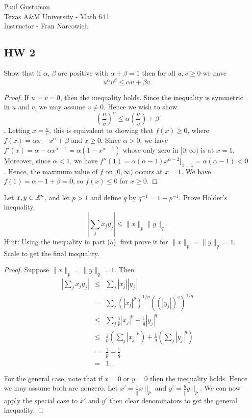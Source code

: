 \documentclass{article}
\begin{document}
\noindent Paul Gustafson\\
\noindent Texas A\&M University - Math 641\\ 
\noindent Instructor - Fran Narcowich

\subsection*{HW 2}
 Show that if $\alpha$, $\beta$ are positive with $\alpha + \beta = 1$ then for all $u,v \ge 0$ we have
$$ u^\alpha v^\beta \le \alpha u + \beta v.$$
\begin{proof} If $u = v = 0$, then the inequality holds. Since the inequality is symmetric in $u$ and $v$, we may assume $v \neq 0$.
Hence we wish to show
$$(\frac u v)^\alpha \le \alpha (\frac u v) + \beta$$.
Letting $x = \frac u v$, this is equivalent to showing that $f(x) \ge 0$, where $f(x) = \alpha x -  x^\alpha + \beta$ and $x \ge 0$.  
Since $\alpha > 0$, we have $f'(x) = \alpha - \alpha x^{\alpha - 1} = \alpha (1 - x^{\alpha - 1})$ whose only zero in $[0,\infty)$ is at $x = 1$.
Moreover, since $\alpha < 1$, we have $f''(1) = \alpha (\alpha - 1) x^{\alpha - 2}|_{x = 1} = \alpha (\alpha - 1)  < 0$ . Hence, the maximum value of $f$ on $[0, \infty)$ occurs at $x = 1$.
We have $f(1) = \alpha -1 + \beta = 0$, so $f(x) \le 0$ for $x \ge 0$.
\end{proof}

 Let $x,y \in \mathbb{R}^n$, and let $p > 1$ and define $q$ by $q^{-1} = 1 - p^{-1}$. Prove H\"{o}lder's inequality, 
$$|\sum_j x_j y_j| ≤ \|x\|_p \|y\|_q. $$
Hint: Using the inequality in part (a). first prove it for $\|x\|_p = \|y\|_q = 1$. Scale to get the final inequality.
\begin{proof}
Suppose $\|x\|_p = \|y\|_q = 1$. Then
\begin{align*}
| \sum_j x_j y_j | & \le & \sum_j |x_j| |y_j|
\\ &  = &  \sum_j (|x_j|^p)^{1/p} ((|y_j|)^q)^{1/q}
\\ & \le & \sum_j \frac 1 p |x_j|^p + \frac 1 q |y_j|^q
\\ & \le & \frac 1 p (\sum_j  |x_j|^p) + \frac 1 q (\sum_j |y_j|^q)
\\ & = & \frac 1 p + \frac 1 q
\\ & = & 1.
\end{align*}

For the general case, note that if $x = 0$ or $y = 0$ then the inequality holds. Hence we may assume both are nonzero.  
Let $x' = \frac x \|x\|_p$ and $y' = \frac y \|y\|_p$.  We can now apply the special case to $x'$ and $y'$ then clear denominators to get the general inequality.
\end{proof}
\end{document}

